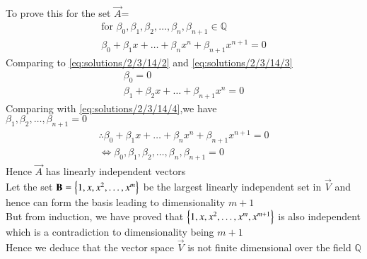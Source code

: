To prove this for the set $\vec{A}$=
\begin{align}
\text{for  }\beta_0,\beta_1,\beta_2,\hdots,\beta_n,\beta_{n+1} \in \mathbb{Q}\\  
  \beta_0+\beta_1x+\hdots+\beta_nx^n+\beta_{n+1}x^{n+1}=0 
\end{align}
Comparing to \eqref{eq:solutions/2/3/14/2} and \eqref{eq:solutions/2/3/14/3}
\begin{align}
    \beta_0=0\\
    \beta_1+\beta_2x+\hdots+\beta_{n+1}x^n=0
\end{align}
Comparing with \eqref{eq:solutions/2/3/14/4},we have\\
$\beta_1,\beta_2,\hdots,\beta_{n+1}=0$
\begin{align}
    \therefore  \beta_0+\beta_1x+\hdots+\beta_nx^n+\beta_{n+1}x^{n+1}=0 
\\ \iff
    \beta_0,\beta_1,\beta_2,\hdots,\beta_n,\beta_{n+1}=0
\end{align}
Hence $\vec{A}$ has linearly independent vectors\\
Let the set $\mathbf{B} =\left\{1,x,x^2,\hdots,x^m\right\}$ be the largest linearly independent set in $\vec{V}$ and hence can form the basis leading to dimensionality $m+1$\\
But from induction, we have proved that $\left\{1,x,x^2,\hdots,x^m,x^{m+1}\right\}$ is also independent which is a contradiction to dimensionality being $m+1$\\
Hence we deduce that the vector space $\vec{V}$ is not finite dimensional over the field $\mathbb{Q}$

